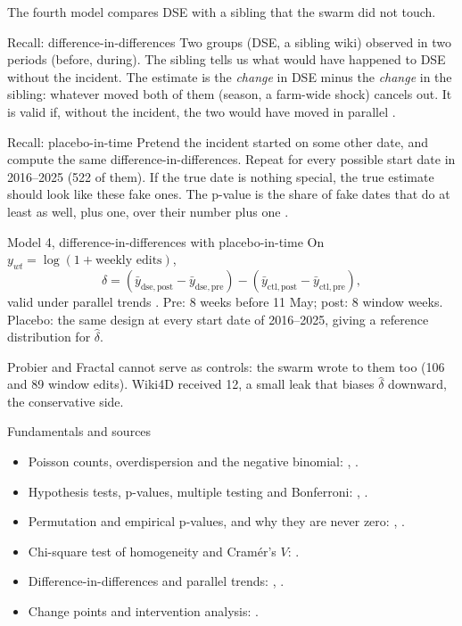 \documentclass[10pt,a4paper]{article}
\begin{document}
The fourth model compares DSE with a sibling that the swarm did not touch.
\begin{morebox}{Recall: difference-in-differences}
Two groups (DSE, a sibling wiki) observed in two periods (before, during). The sibling tells us what would have happened to DSE without the incident. The estimate is the \emph{change} in DSE minus the \emph{change} in the sibling: whatever moved both of them (season, a farm-wide shock) cancels out. It is valid if, without the incident, the two would have moved in parallel \citep[ch.~5]{angrist2009mostly}.
\end{morebox}
\begin{morebox}{Recall: placebo-in-time}
Pretend the incident started on some other date, and compute the same difference-in-differences. Repeat for every possible start date in 2016--2025 (522 of them). If the true date is nothing special, the true estimate should look like these fake ones. The p-value is the share of fake dates that do at least as well, plus one, over their number plus one \citep{phipson2010permutation}.
\end{morebox}
\begin{defbox}{Model 4, difference-in-differences with placebo-in-time}
On $y_{wt} = \log(1 + \text{weekly edits})$,
$$\hat\delta = (\bar y_{\mathrm{dse,post}} - \bar y_{\mathrm{dse,pre}}) - (\bar y_{\mathrm{ctl,post}} - \bar y_{\mathrm{ctl,pre}}),$$
valid under parallel trends \citep[ch.~19]{wasserman2004all}. Pre: 8 weeks before 11 May; post: 8 window weeks. Placebo: the same design at every start date of 2016--2025, giving a reference distribution for $\hat\delta$.
\end{defbox}
\begin{rembox}
Probier and Fractal cannot serve as controls: the swarm wrote to them too (106 and 89 window edits). Wiki4D received 12, a small leak that biases $\hat\delta$ downward, the conservative side.
\end{rembox}

\begin{morebox}{Fundamentals and sources}
\begin{itemize}
\item Poisson counts, overdispersion and the negative binomial: \citet[\S11.2, \S12.1]{mcelreath2020rethinking}, \citet[\S17.2]{gelman2013bda}.
\item Hypothesis tests, p-values, multiple testing and Bonferroni: \citet[ch.~11]{wasserman2004all}, \citet[ch.~3]{bruce2020practical}.
\item Permutation and empirical p-values, and why they are never zero: \citet[ch.~3]{bruce2020practical}, \citet{phipson2010permutation}.
\item Chi-square test of homogeneity and Cram\'er's $V$: \citet[ch.~3]{bruce2020practical}.
\item Difference-in-differences and parallel trends: \citet[ch.~5]{angrist2009mostly}, \citet[ch.~19]{wasserman2004all}.
\item Change points and intervention analysis: \citet[\S11.1]{cryer2008time}.
\end{itemize}
\end{morebox}
\end{document}
